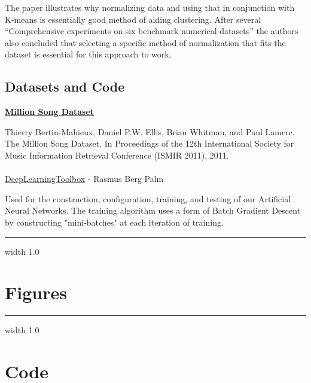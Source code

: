 \documentclass[12pt]{article}
\newcommand{\horizontalLine}{
	\begin{center}
		\hrule width 1.0\textwidth
	\end{center}
}
\begin{document}
The paper illustrates why normalizing data and using that in conjunction with K-means is essentially good method of aiding clustering. After several ``Comprehensive experiments on six benchmark numerical datasets'' the authors also concluded that selecting a specific method of normalization that fits the dataset is essential for this approach to work.

\subsection{Datasets and Code}
\href{http://labrosa.ee.columbia.edu/millionsong/}{\textbf{Million Song Dataset}}

Thierry Bertin-Mahieux, Daniel P.W. Ellis, Brian Whitman, and Paul Lamere. 
The Million Song Dataset. In Proceedings of the 12th International Society
for Music Information Retrieval Conference (ISMIR 2011), 2011.
\\
\\
\href{https://github.com/rasmusbergpalm/DeepLearnToolbox}{DeepLearningToolbox} - Rasmus Berg Palm

Used for the construction, configuration, training, and testing of our Artificial Neural Networks. The training algorithm uses a form of Batch Gradient Descent by constructing "mini-batches" at each iteration of training.

\appendix

\horizontalLine
\section{Figures}
\label{sec:figures}

\horizontalLine
\section{Code}
\label{sec:code}
\end{document}
